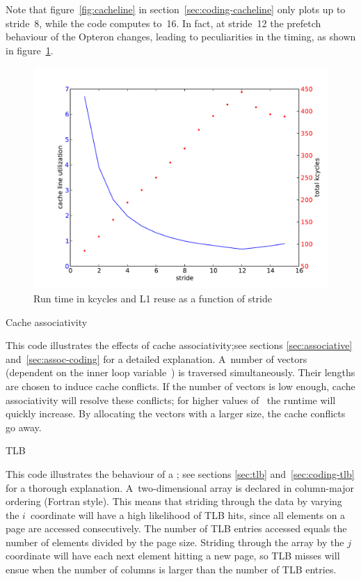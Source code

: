 Note that figure~\ref{fig:cacheline} in
section~\ref{sec:coding-cacheline} only plots up to stride~8, while
the code computes to~16. In fact, at stride~12 the prefetch behaviour
of the Opteron changes, leading to peculiarities in the timing, as
shown in figure~\ref{fig:cacheline16}.
\begin{figure}[ht]
  \includegraphics[scale=.5]{graphics-public/cacheline16}
  \caption{Run time in kcycles and L1 reuse as a function of stride}
  \label{fig:cacheline16}
\end{figure}

 {Cache associativity}
\label{sec:assoc-code}

This code illustrates the effects of cache associativity;see sections
\ref{sec:associative} and~\ref{sec:assoc-coding} for a detailed
explanation. A~number of vectors (dependent on the inner loop
variable~) is traversed simultaneously.  Their lengths are
chosen to induce cache conflicts. If the number of vectors is low
enough, cache associativity will resolve these conflicts; for higher
values of~ the runtime will quickly increase. By allocating the
vectors with a larger size, the cache conflicts go away.

\begingroup\small

\endgroup

 {TLB}
\label{sec:tlb-code}

This code illustrates the behaviour of a ; see sections
\ref{sec:tlb} and~\ref{sec:coding-tlb} for a thorough
explanation. A~two-dimensional array is declared in column-major
ordering (Fortran style). This means that striding through the data by
varying the $i$~coordinate will have a high likelihood of TLB hits,
since all elements on a page are accessed consecutively. The number of
TLB entries accessed equals the number of elements divided by the page
size. Striding through the array by the $j$ coordinate will have each
next element hitting a new page, so TLB misses will ensue when the
number of columns is larger than the number of TLB entries.

\begingroup\small

\endgroup
